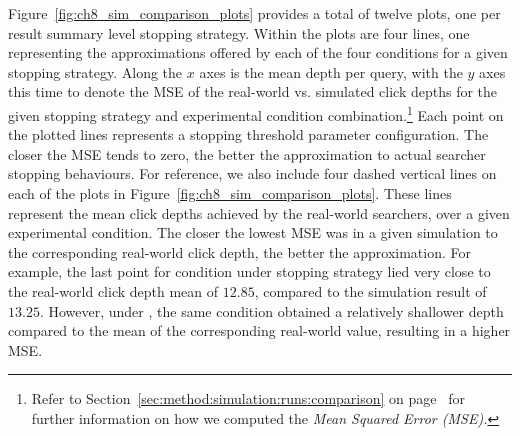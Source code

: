 Figure~\ref{fig:ch8_sim_comparison_plots} provides a total of twelve plots, one per result summary level stopping strategy. Within the plots are four lines, one representing the approximations offered by each of the four conditions for a given stopping strategy. Along the $x$ axes is the mean depth per query, with the $y$ axes this time to denote the MSE of the real-world vs. simulated click depths for the given stopping strategy and experimental condition combination.\footnote{Refer to Section~\ref{sec:method:simulation:runs:comparison} on page~\pageref{sec:method:simulation:runs:comparison} for further information on how we computed the \emph{Mean Squared Error (MSE).}} Each point on the plotted lines represents a stopping threshold parameter configuration. The closer the MSE tends to zero, the better the approximation to actual searcher stopping behaviours. For reference, we also include four dashed vertical lines on each of the plots in Figure~\ref{fig:ch8_sim_comparison_plots}. These lines represent the mean click depths achieved by the real-world searchers, over a given experimental condition. The closer the lowest MSE was in a given simulation to the corresponding real-world click depth, the better the approximation. For example, the last point for condition  under stopping strategy  lied very close to the real-world click depth mean of $12.85$, compared to the simulation result of $13.25$. However, under , the same condition obtained a relatively shallower depth compared to the mean of the corresponding real-world value, resulting in a higher MSE.

